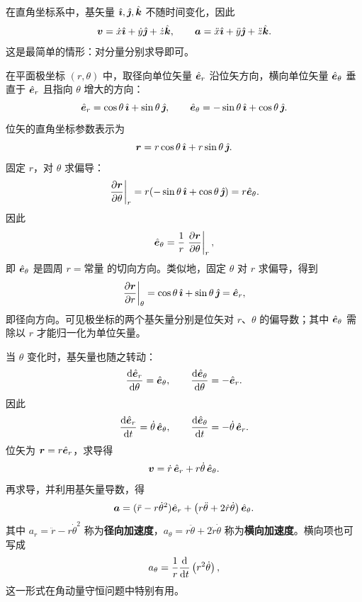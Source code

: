 在直角坐标系中，基矢量 $\ii,\jj,\kk$ 不随时间变化，因此
\begin{equation}
\bv=\dot x\ii+\dot y\jj+\dot z\kk,\qquad
\ba=\ddot x\ii+\ddot y\jj+\ddot z\kk .
\end{equation}
这是最简单的情形：对分量分别求导即可。

在平面极坐标 $(r,\theta)$ 中，取径向单位矢量 $\er$ 沿位矢方向，横向单位矢量 $\etheta$ 垂直于 $\er$ 且指向 $\theta$ 增大的方向：
\begin{equation}
\er=\cos\theta\,\ii+\sin\theta\,\jj,\qquad
\etheta=-\sin\theta\,\ii+\cos\theta\,\jj .
\end{equation}
位矢的直角坐标参数表示为
\begin{equation}
\br=r\cos\theta\,\ii+r\sin\theta\,\jj .
\label{eq:position-polar-cartesian}
\end{equation}
固定 $r$，对 $\theta$ 求偏导：
\begin{equation}
\left.\pdv{\br}{\theta}\right|_r
=r(-\sin\theta\,\ii+\cos\theta\,\jj)=r\etheta .
\label{eq:polar-tangent}
\end{equation}
因此
\[
\etheta=\frac{1}{r}\left.\pdv{\br}{\theta}\right|_r,
\]
即 $\etheta$ 是圆周 $r=\text{常量}$ 的切向方向。类似地，固定 $\theta$ 对 $r$ 求偏导，得到
\[
\left.\pdv{\br}{r}\right|_\theta
=\cos\theta\,\ii+\sin\theta\,\jj=\er,
\]
即径向方向。可见极坐标的两个基矢量分别是位矢对 $r$、$\theta$ 的偏导数；其中 $\etheta$ 需除以 $r$ 才能归一化为单位矢量。

当 $\theta$ 变化时，基矢量也随之转动：
\begin{equation}
\dv{\er}{\theta}=\etheta,\qquad
\dv{\etheta}{\theta}=-\er .
\label{eq:polar-unit}
\end{equation}
因此
\begin{equation}
\dv{\er}{t}=\dot\theta\,\etheta,\qquad
\dv{\etheta}{t}=-\dot\theta\,\er .
\end{equation}
位矢为 $\br=r\er$，求导得
\begin{equation}
\bv=\dot r\,\er+r\dot\theta\,\etheta .
\label{eq:polar-velocity}
\end{equation}
再求导，并利用基矢量导数，得
\begin{equation}
\ba=(\ddot r-r\dot\theta^2)\er+
\left(r\ddot\theta+2\dot r\dot\theta\right)\etheta .
\label{eq:polar-acceleration}
\end{equation}
其中 $a_r=\ddot r-r\dot\theta^2$ 称为\textbf{径向加速度}，$a_\theta=r\ddot\theta+2\dot r\dot\theta$ 称为\textbf{横向加速度}。横向项也可写成
\begin{equation}
a_\theta=\frac{1}{r}\dv{}{t}\left(r^2\dot\theta\right),
\label{eq:polar-transverse}
\end{equation}
这一形式在角动量守恒问题中特别有用。

